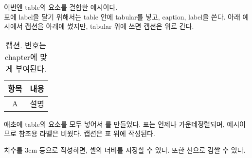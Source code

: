 \vspace{10pt}%
이번엔 table의 요소를 결합한 예시이다. \\
표에 label을 달기 위해서는 table 안에 tabular를 넣고, caption, label을 쓴다.
아래 예시에서 캡션을 아래에 썼지만, tabular 위에 쓰면 캡션은 위로 간다.
\begin{table}[h] %
  \centering %
  \begin{tabular}{|c|c|}
    \hline
    항목 & 내용 \\
    \hline
    A & 설명 \\
    \hline
  \end{tabular}
  \caption{캡션. 번호는 chapter에 맞게 부여된다.}
\end{table}%

\vspace{10pt}%
애초에 table의 요소를 모두 넣어서 를 만들었다.
표는 언제나 가운데정렬되며, 예시이므로 참조용 라벨은 비웠다. 캡션은 표 위에 작성된다.



\vspace{10pt}%
치수를 3cm 등으로 작성하면, 셀의 너비를 지정할 수 있다. 또한 선으로 감쌀 수 있다.



